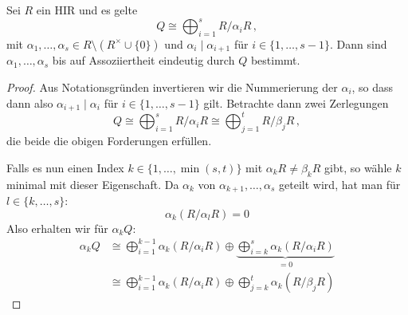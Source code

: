 \begin{thLemma}\label{lem:iso:divisors:unique}
    Sei $R$ ein HIR und es gelte
    \[ Q \cong \bigoplus_{i=1}^s R/\alpha_i R \,, \]
    mit $\alpha_1,\ldots,\alpha_s \in R\setminus (R^\times\cup\{0\})$ und
    $\alpha_i\mid\alpha_{i+1}$ für $i\in\{1,\ldots,s-1\}$.
    Dann sind $\alpha_1,\ldots,\alpha_s$ bis auf Assoziiertheit eindeutig durch
    $Q$ bestimmt.
\end{thLemma}

\begin{proof}
    Aus Notationsgründen invertieren wir die Nummerierung der $\alpha_i$,
    so dass dann also $\alpha_{i+1} \mid \alpha_i$ für $i\in\{1,\ldots,s-1\}$
    gilt. Betrachte dann zwei Zerlegungen
    \[ Q \cong 
        \bigoplus_{i=1}^s R/\alpha_i R \cong \bigoplus_{j=1}^t R/\beta_j R \,,\]
    die beide die obigen Forderungen erfüllen.
    
    Falls es nun einen Index $k\in\{1,\ldots,\min(s,t)\}$ mit
    $\alpha_k R \neq \beta_k R$ gibt, so wähle $k$ minimal mit dieser
    Eigenschaft. Da $\alpha_k$ von $\alpha_{k+1},\ldots,\alpha_s$ geteilt wird,
    hat man für $l\in\{k,\ldots,s\}$:
    \[ \alpha_k (R/\alpha_l R) = 0 \]
    Also erhalten wir für $\alpha_k Q$:
    \begin{align*}
        \alpha_k Q 
        &\cong      \bigoplus_{i=1}^{k-1} \alpha_k (R/\alpha_i R) \oplus
        \underbrace{\bigoplus_{i=k}^{s}   \alpha_k (R/\alpha_i R)}_{= 0}  \\
        &\cong \bigoplus_{i=1}^{k-1} \alpha_k (R/\alpha_i R) \oplus
               \bigoplus_{j=k}^{t}   \alpha_k (R/\beta_j R)
    \end{align*}
    

\end{proof}
